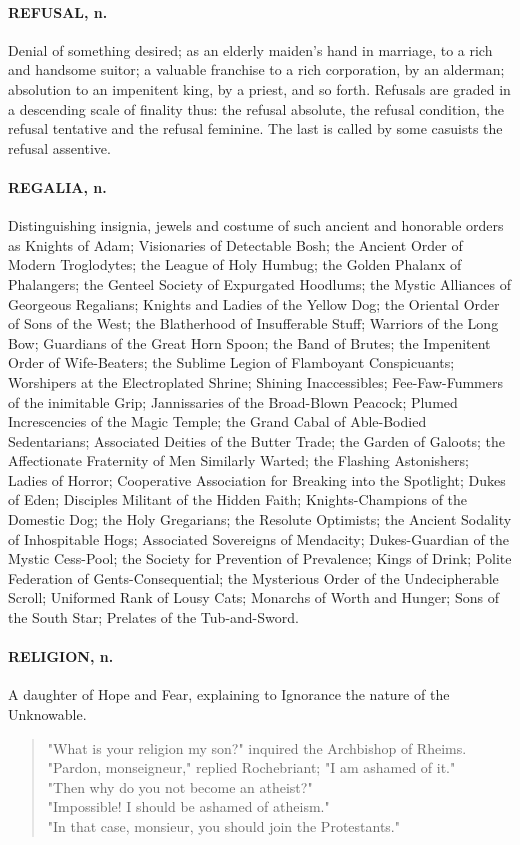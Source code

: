 \documentclass[11pt]{article}
\begin{document}
\paragraph{REFUSAL, n.}  Denial of something desired; as an elderly maiden's hand
in marriage, to a rich and handsome suitor; a valuable franchise to a
rich corporation, by an alderman; absolution to an impenitent king, by
a priest, and so forth.  Refusals are graded in a descending scale of
finality thus:  the refusal absolute, the refusal condition, the
refusal tentative and the refusal feminine.  The last is called by
some casuists the refusal assentive.

\paragraph{REGALIA, n.}  Distinguishing insignia, jewels and costume of such
ancient and honorable orders as Knights of Adam; Visionaries of
Detectable Bosh; the Ancient Order of Modern Troglodytes; the League
of Holy Humbug; the Golden Phalanx of Phalangers; the Genteel Society
of Expurgated Hoodlums; the Mystic Alliances of Georgeous Regalians;
Knights and Ladies of the Yellow Dog; the Oriental Order of Sons of
the West; the Blatherhood of Insufferable Stuff; Warriors of the Long
Bow; Guardians of the Great Horn Spoon; the Band of Brutes; the
Impenitent Order of Wife-Beaters; the Sublime Legion of Flamboyant
Conspicuants; Worshipers at the Electroplated Shrine; Shining
Inaccessibles; Fee-Faw-Fummers of the inimitable Grip; Jannissaries of
the Broad-Blown Peacock; Plumed Increscencies of the Magic Temple; the
Grand Cabal of Able-Bodied Sedentarians; Associated Deities of the
Butter Trade; the Garden of Galoots; the Affectionate Fraternity of
Men Similarly Warted; the Flashing Astonishers; Ladies of Horror;
Cooperative Association for Breaking into the Spotlight; Dukes of Eden;
Disciples Militant of the Hidden Faith; Knights-Champions of the
Domestic Dog; the Holy Gregarians; the Resolute Optimists; the Ancient
Sodality of Inhospitable Hogs; Associated Sovereigns of Mendacity;
Dukes-Guardian of the Mystic Cess-Pool; the Society for Prevention of
Prevalence; Kings of Drink; Polite Federation of Gents-Consequential;
the Mysterious Order of the Undecipherable Scroll; Uniformed Rank of
Lousy Cats; Monarchs of Worth and Hunger; Sons of the South Star;
Prelates of the Tub-and-Sword.

\paragraph{RELIGION, n.}  A daughter of Hope and Fear, explaining to Ignorance the
nature of the Unknowable.
\begin{quote}   "What is your religion my son?" inquired the Archbishop of Rheims. \\
  "Pardon, monseigneur," replied Rochebriant; "I am ashamed of it." \\
  "Then why do you not become an atheist?" \\
  "Impossible!  I should be ashamed of atheism." \\
  "In that case, monsieur, you should join the Protestants."  \end{quote}
\end{document}
